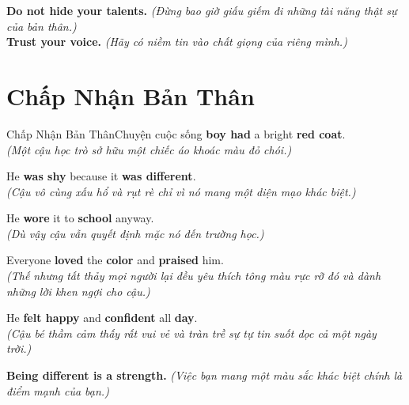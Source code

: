 \begin{baihoc}
  \textbf{Do not hide your talents.} \textit{(Đừng bao giờ giấu giếm đi những tài năng thật sự của bản thân.)}\\
  \textbf{Trust your voice.} \textit{(Hãy có niềm tin vào chất giọng của riêng mình.)}
\end{baihoc}

\vspace{0.8cm}

\ngayDay{}
\section{Chấp Nhận Bản Thân}
\begin{truyen}{Chấp Nhận Bản Thân}{Chuyện cuộc sống}
 \textbf{boy had} a bright \textbf{red coat}.\\
\textit{(Một cậu học trò sở hữu một chiếc áo khoác màu đỏ chói.)}

He \textbf{was shy} because it \textbf{was different}.\\
\textit{(Cậu vô cùng xấu hổ và rụt rè chỉ vì nó mang một diện mạo khác biệt.)}

He \textbf{wore} it to \textbf{school} anyway.\\
\textit{(Dù vậy cậu vẫn quyết định mặc nó đến trường học.)}

Everyone \textbf{loved} the \textbf{color} and \textbf{praised} him.\\
\textit{(Thế nhưng tất thảy mọi người lại đều yêu thích tông màu rực rỡ đó và dành những lời khen ngợi cho cậu.)}

He \textbf{felt happy} and \textbf{confident} all \textbf{day}.\\
\textit{(Cậu bé thầm cảm thấy rất vui vẻ và tràn trề sự tự tin suốt dọc cả một ngày trời.)}
\end{truyen}

\begin{baihoc}
  \textbf{Being different is a strength.} \textit{(Việc bạn mang một màu sắc khác biệt chính là điểm mạnh của bạn.)}
\end{baihoc}

\vspace{0.8cm}

\ngayDay{}
